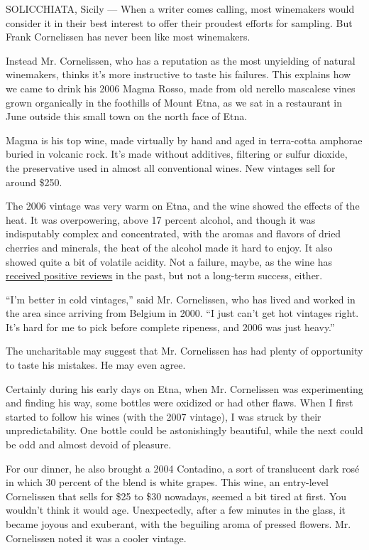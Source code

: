 SOLICCHIATA, Sicily --- When a writer comes calling, most winemakers
would consider it in their best interest to offer their proudest efforts
for sampling. But Frank Cornelissen has never been like most winemakers.

Instead Mr. Cornelissen, who has a reputation as the most unyielding of
natural winemakers, thinks it's more instructive to taste his failures.
This explains how we came to drink his 2006 Magma Rosso, made from old
nerello mascalese vines grown organically in the foothills of Mount
Etna, as we sat in a restaurant in June outside this small town on the
north face of Etna.

Magma is his top wine, made virtually by hand and aged in terra-cotta
amphorae buried in volcanic rock. It's made without additives, filtering
or sulfur dioxide, the preservative used in almost all conventional
wines. New vintages sell for around \$250.

The 2006 vintage was very warm on Etna, and the wine showed the effects
of the heat. It was overpowering, above 17 percent alcohol, and though
it was indisputably complex and concentrated, with the aromas and
flavors of dried cherries and minerals, the heat of the alcohol made it
hard to enjoy. It also showed quite a bit of volatile acidity. Not a
failure, maybe, as the wine has
\href{http://www.wineanorak.com/frank_cornelissen.htm}{received positive
reviews} in the past, but not a long-term success, either.

``I'm better in cold vintages,'' said Mr. Cornelissen, who has lived and
worked in the area since arriving from Belgium in 2000. ``I just can't
get hot vintages right. It's hard for me to pick before complete
ripeness, and 2006 was just heavy.''

The uncharitable may suggest that Mr. Cornelissen has had plenty of
opportunity to taste his mistakes. He may even agree.

Certainly during his early days on Etna, when Mr. Cornelissen was
experimenting and finding his way, some bottles were oxidized or had
other flaws. When I first started to follow his wines (with the 2007
vintage), I was struck by their unpredictability. One bottle could be
astonishingly beautiful, while the next could be odd and almost devoid
of pleasure.

For our dinner, he also brought a 2004 Contadino, a sort of translucent
dark rosé in which 30 percent of the blend is white grapes. This wine,
an entry-level Cornelissen that sells for \$25 to \$30 nowadays, seemed
a bit tired at first. You wouldn't think it would age. Unexpectedly,
after a few minutes in the glass, it became joyous and exuberant, with
the beguiling aroma of pressed flowers. Mr. Cornelissen noted it was a
cooler vintage.

